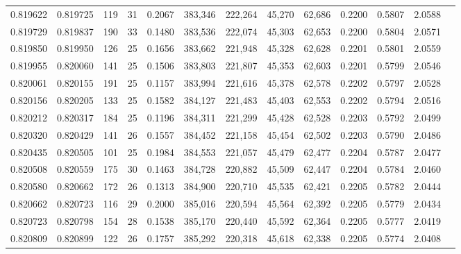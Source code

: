 \begin{tabular}{rrrrrrrrrrrrr}
0.819622 & 0.819725 &   119 &  31 &                                     0.2067 & 383,346 & 222,264 &  45,270 &  62,686 & 0.2200 & 0.5807 & 2.0588 \\
0.819729 & 0.819837 &   190 &  33 &                                     0.1480 & 383,536 & 222,074 &  45,303 &  62,653 & 0.2200 & 0.5804 & 2.0571 \\
0.819850 & 0.819950 &   126 &  25 &                                     0.1656 & 383,662 & 221,948 &  45,328 &  62,628 & 0.2201 & 0.5801 & 2.0559 \\
0.819955 & 0.820060 &   141 &  25 &                                     0.1506 & 383,803 & 221,807 &  45,353 &  62,603 & 0.2201 & 0.5799 & 2.0546 \\
0.820061 & 0.820155 &   191 &  25 &                                     0.1157 & 383,994 & 221,616 &  45,378 &  62,578 & 0.2202 & 0.5797 & 2.0528 \\
0.820156 & 0.820205 &   133 &  25 &                                     0.1582 & 384,127 & 221,483 &  45,403 &  62,553 & 0.2202 & 0.5794 & 2.0516 \\
0.820212 & 0.820317 &   184 &  25 &                                     0.1196 & 384,311 & 221,299 &  45,428 &  62,528 & 0.2203 & 0.5792 & 2.0499 \\
0.820320 & 0.820429 &   141 &  26 &                                     0.1557 & 384,452 & 221,158 &  45,454 &  62,502 & 0.2203 & 0.5790 & 2.0486 \\
0.820435 & 0.820505 &   101 &  25 &                                     0.1984 & 384,553 & 221,057 &  45,479 &  62,477 & 0.2204 & 0.5787 & 2.0477 \\
0.820508 & 0.820559 &   175 &  30 &                                     0.1463 & 384,728 & 220,882 &  45,509 &  62,447 & 0.2204 & 0.5784 & 2.0460 \\
0.820580 & 0.820662 &   172 &  26 &                                     0.1313 & 384,900 & 220,710 &  45,535 &  62,421 & 0.2205 & 0.5782 & 2.0444 \\
0.820662 & 0.820723 &   116 &  29 &                                     0.2000 & 385,016 & 220,594 &  45,564 &  62,392 & 0.2205 & 0.5779 & 2.0434 \\
0.820723 & 0.820798 &   154 &  28 &                                     0.1538 & 385,170 & 220,440 &  45,592 &  62,364 & 0.2205 & 0.5777 & 2.0419 \\
0.820809 & 0.820899 &   122 &  26 &                                     0.1757 & 385,292 & 220,318 &  45,618 &  62,338 & 0.2205 & 0.5774 & 2.0408 \\

\end{tabular}
